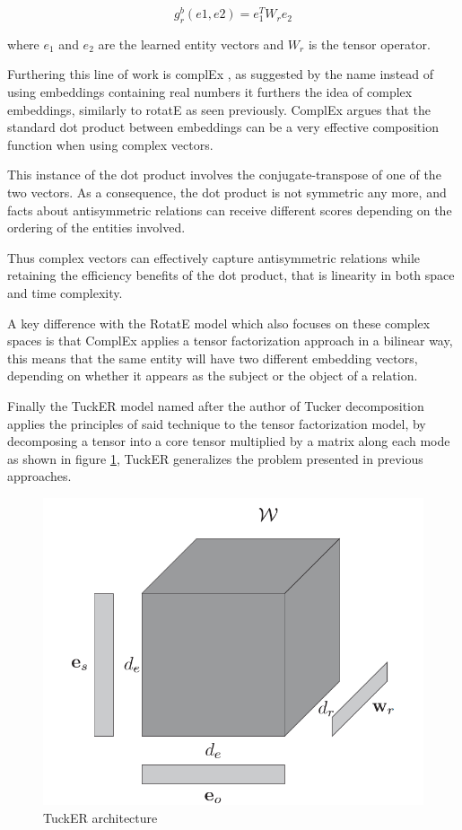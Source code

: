\begin{equation}
    \label{eq:distmult_scoring}
    g^b_r (e1, e2) = e_1^T W_r e_2
\end{equation}

where $e_1$ and $e_2$ are the learned entity vectors and $W_r$ is the tensor operator. 

Furthering this line of work is complEx \cite{}, as suggested by the name instead of using embeddings containing real numbers it furthers the idea of complex embeddings, similarly to rotatE as seen previously. ComplEx argues that the standard dot product between embeddings can be a very effective composition function when using complex vectors.

This instance of the dot product involves the conjugate-transpose of one of the two vectors. As a consequence, the dot product is not symmetric any more, and facts about antisymmetric relations can receive different scores depending on the ordering of the entities involved.

Thus complex vectors can effectively capture antisymmetric relations while retaining the efficiency benefits of the dot product, that is linearity in both space and time complexity.

A key difference with the RotatE model which also focuses on these complex spaces is that ComplEx applies a tensor factorization approach in a bilinear way, this means that the same entity will have two different embedding vectors, depending on whether it appears as the subject or the object of a relation.

Finally the TuckER \cite{} model named after the author of Tucker decomposition \cite{} applies the principles of said technique to the tensor factorization model, by decomposing a tensor into a core tensor multiplied by a matrix along each mode as shown in figure \ref{fig:emb-tucker}, TuckER generalizes the problem presented in previous approaches.

\begin{figure}[!ht]
    \centering
    \includegraphics[width=.45\textwidth]{fig/embeddings/TuckER.png}
    \caption{TuckER architecture}
    \label{fig:emb-tucker}
\end{figure}


